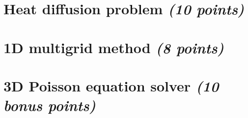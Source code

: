 \documentclass[11 pt]{article}
\begin{document}
    \section{Heat diffusion problem \textit{(10 points)}}
    
    \newpage

    \section{1D multigrid method \textit{(8 points)}}
    
    \newpage

    \section{3D Poisson equation solver \textit{(10 bonus points)}}
     
    \newpage
\end{document}
